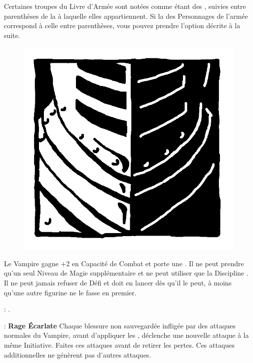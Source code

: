 
Certaines troupes du Livre d'Armée sont notées comme étant des \bloodties{}, suivies entre parenthèses de la \bloodline{} à laquelle elles appartiennent. Si la \bloodline{} des Personnages \vampires{} de l'armée correspond à celle entre parenthèses, vous pouvez prendre l'option décrite à la suite.


\begin{figure}
\centering
\includegraphics[width=\logosize]{pics/logo_brotherhood.png}
\end{figure}
Le Vampire gagne +2 en Capacité de Combat et porte une \platearmour{}. Il ne peut prendre qu'un seul Niveau de Magie supplémentaire et ne peut utiliser que la Discipline \necromancy{}. Il ne peut jamais refuser de Défi et doit en lancer dès qu'il le peut, à moins qu'une autre figurine ne le fasse en premier.

\vspace{0.5cm}
\bloodtie{} : \textbf{\vampireknights{}}.

\vspace{0.5cm}
\ancientbloodpower{} : \textbf{Rage Écarlate}\dotfill{}\newline%
Chaque blessure non sauvegardée infligée par des attaques normales du Vampire, avant d'appliquer les \multiplewounds{}{}, déclenche une nouvelle attaque à la même Initiative. Faites ces attaques avant de retirer les pertes. Ces attaques additionnelles ne génèrent pas d'autres attaques.

